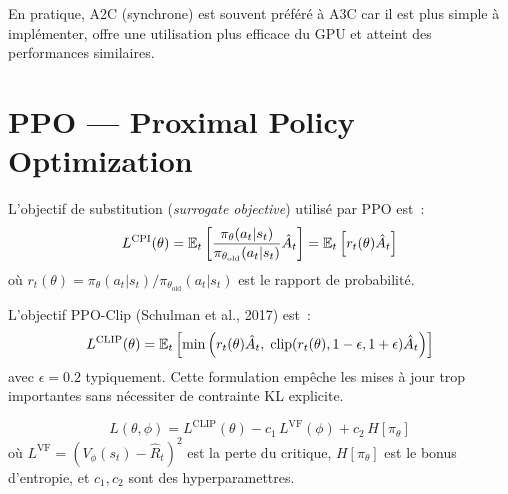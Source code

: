 \begin{remarque}
En pratique, A2C (synchrone) est souvent pr\'ef\'er\'e \`a A3C car il est plus
simple \`a impl\'ementer, offre une utilisation plus efficace du GPU et atteint
des performances similaires.
\end{remarque}

\section{PPO --- Proximal Policy Optimization}

\begin{definition}
L'objectif de substitution (\emph{surrogate objective}) utilis\'e par PPO est~:
\[
    L^{\text{CPI}}(\theta) = \mathbb{E}_t\left[\frac{\pi_\theta(a_t|s_t)}{\pi_{\theta_{\text{old}}}(a_t|s_t)}
    \hat{A}_t\right] = \mathbb{E}_t\left[r_t(\theta) \hat{A}_t\right]
\]
o\`u $r_t(\theta) = \pi_\theta(a_t|s_t) / \pi_{\theta_{\text{old}}}(a_t|s_t)$ est
le rapport de probabilit\'e.
\end{definition}

\begin{theoreme}
L'objectif PPO-Clip (Schulman et al., 2017) est~:
\[
    L^{\text{CLIP}}(\theta) = \mathbb{E}_t\left[\min\left(
    r_t(\theta) \hat{A}_t, \;
    \text{clip}(r_t(\theta), 1-\epsilon, 1+\epsilon) \hat{A}_t
    \right)\right]
\]
avec $\epsilon = 0.2$ typiquement. Cette formulation emp\^eche les mises \`a jour
trop importantes sans n\'ecessiter de contrainte KL explicite.
\end{theoreme}

\begin{formules}[title=\textbf{Objectif complet de PPO}]
\[
    L(\theta, \phi) = L^{\text{CLIP}}(\theta) - c_1 \, L^{\text{VF}}(\phi)
    + c_2 \, H[\pi_\theta]
\]
o\`u $L^{\text{VF}} = (V_\phi(s_t) - \hat{R}_t)^2$ est la perte du critique,
$H[\pi_\theta]$ est le bonus d'entropie, et $c_1, c_2$ sont des hyperparamettres.
\end{formules}


